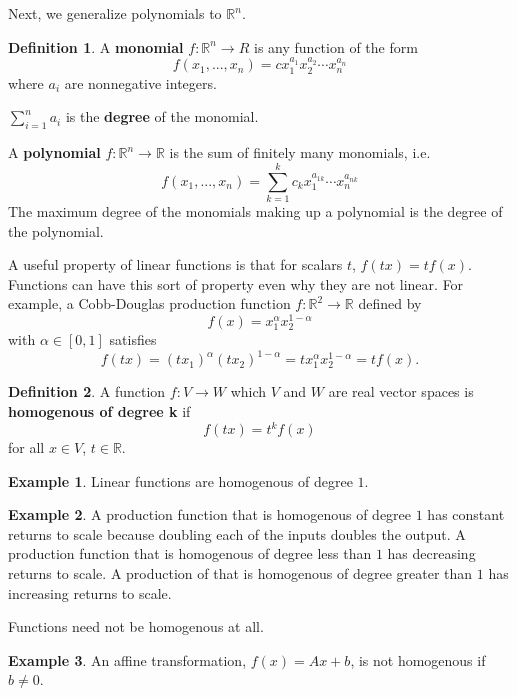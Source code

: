 \documentclass[12pt,reqno]{amsart}
\theoremstyle{definition}
\newtheorem{definition}{Definition}[section]
\newtheorem{example}{Example}[section]
\def\R{\mathbb{R}}
\renewcommand{\to}{{\rightarrow}}
\begin{document}
Next, we generalize polynomials to $\R^n$. 
\begin{definition}
  A \textbf{monomial} $f:\R^n \to R$ is any function of the form
  \[ f(x_1, ..., x_n) = c x_1^{a_1} x_2^{a_2} \cdots x_n^{a_n} \]
  where $a_i$ are nonnegative integers. 

  $\sum_{i=1}^n a_i$ is the \textbf{degree} of the monomial. 

  A \textbf{polynomial} $f:\R^n \to \R$ is the sum of finitely many
  monomials, i.e.
  \[ f(x_1, ..., x_n) = \sum_{k=1}^k c_k x_1^{a_{1k}}\cdots
  x_n^{a_{nk}} \]
  The maximum degree of the monomials making up a polynomial is the
  degree of the polynomial.
\end{definition}

A useful property of linear functions is that for scalars $t$, $f(t x)
= t f(x)$. Functions can have this sort of property even why they are
not linear. For example, a Cobb-Douglas production function $f: \R^2
\to \R$ defined by
\[ f(x) = x_1^{\alpha} x_2^{1-\alpha} \]
with $\alpha \in [0,1]$ satisfies 
\[ f(t x) = (t x_1)^{\alpha}(t x_2)^{1-\alpha} = t x_1^{\alpha}
x_2^{1-\alpha} = t f(x). \]
\begin{definition}
  A function $f: V \to W$ which $V$ and $W$ are real vector spaces is
  \textbf{homogenous of degree k} if 
  \[ f( t x) = t^k f(x) \]
  for all $x \in V$, $t \in \R$.
\end{definition}
\begin{example}
  Linear functions are homogenous of degree $1$.
\end{example}
\begin{example}
  A production function that is homogenous of degree $1$ has constant
  returns to scale because doubling each of the inputs doubles the
  output. A production function that is homogenous of degree less than
  $1$ has decreasing returns to scale. A production of that is
  homogenous of degree greater than $1$ has increasing returns to
  scale. 
\end{example}
Functions need not be homogenous at all. 
\begin{example}
  An affine transformation, $f(x) = Ax + b$, is not homogenous if $b
  \neq 0$. 
\end{example}
\end{document}
